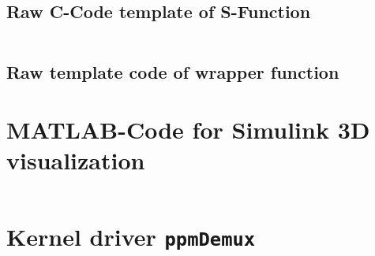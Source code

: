\subsection{Raw C-Code template of S-Function}
\label{sec:c-sFunc-Code:rawTemplate}
\begin{lstlisting}[caption={[C-Code template 'myUdpSource.c' generated by the S-Function Builder]Complete C-Code template file 'myUdpSource.c' generated by the S-Function Builder according to the example shown in chapter \ref{sec:udpMatlab:simulinkBlock:builder}},label=code:c-sFunc-Code:rawTemplate]
\end{lstlisting}

\newpage
\subsection{Raw template code of wrapper function}
\label{sec:c-sFunc-Code:wrapperOutputs}


\section{MATLAB-Code for Simulink 3D visualization}
\label{sec:d-mFunc-Code}

\begin{lstlisting}[caption={[MATLAB-Code for 3D visualization of orientation angles]MATLAB-Code for a MATLAB-function block to realize a 3D visualization of the Quadrocopter's orientation angles},language=MATLAB,label=code:d-mFunc-Code:3dViz]
\end{lstlisting}

\section{Kernel driver \texttt{ppmDemux}}
\label{sec:append-ppmDemuxCode}

